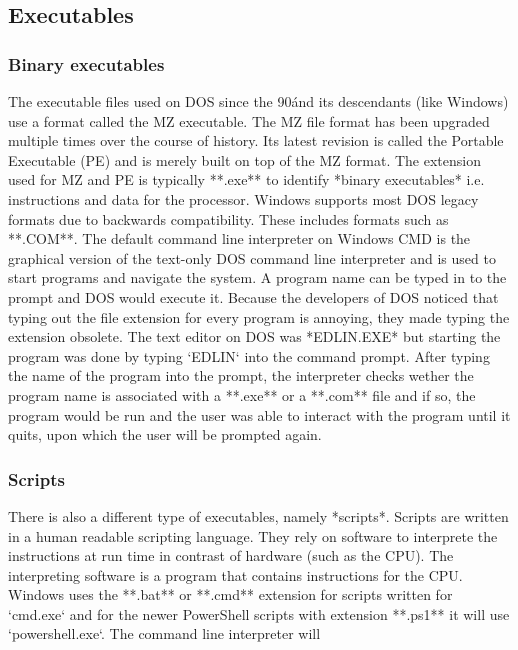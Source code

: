 \subsection{Executables}

\subsubsection{Binary executables}

The executable files used on DOS since the 90\' and its descendants (like Windows) use a format called the MZ
executable. The MZ file format has been upgraded multiple times over the course of history. Its latest revision
is called the Portable Executable (PE) and is merely built on top of the MZ format. The extension used for
MZ and PE is typically **.exe** to identify *binary executables* i.e. instructions and data for the
processor. Windows supports most DOS legacy formats due to backwards compatibility. These includes formats
such as **.COM**. The default command line interpreter on Windows CMD is the graphical version of the
text-only DOS command line interpreter and is used to start programs and navigate the system. A program
name can be typed in to the prompt and DOS would execute it. Because the developers of DOS noticed that
typing out the file extension for every program is annoying, they made typing the extension obsolete.
The text editor on DOS was *EDLIN.EXE* but starting the program was done by typing `EDLIN` into the command
prompt. After typing the name of the program into the prompt, the interpreter checks wether the program name
is associated with a **.exe** or a **.com** file and if so, the program would be run and the user was able
to interact with the program until it quits, upon which the user will be prompted again. 

\subsubsection{Scripts}

There is also a different type of executables, namely *scripts*. Scripts are written in a human readable
scripting language. They rely on software to interprete the instructions at run time in contrast of
hardware (such as the CPU). The interpreting software is a program that contains instructions for
the CPU. Windows uses the **.bat** or **.cmd** extension for scripts written for `cmd.exe` and for
the newer PowerShell scripts with extension **.ps1** it will use `powershell.exe`. The command line
interpreter will 

